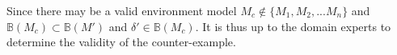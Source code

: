 Since there may be a valid environment model $M_c\not\in\{M_1,M_2,...M_n\}$ and $\mathbb{B}(M_c)\subset\mathbb{B}(M')$ and $\delta'\in\mathbb{B}(M_c)$. 
It is thus up to the domain experts to determine the validity of the counter-example.
%
%
